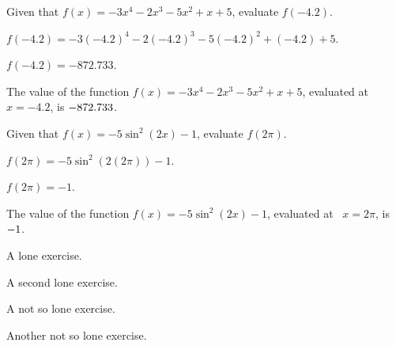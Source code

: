 \documentclass[handout]{ximera}
\begin{document}
\begin{shuffle}
\begin{exercise}
Given that $f(x)=-3 x^4-2 x^3-5 x^2+x+5$, evaluate $f(-4.2)$.
\begin{solution}
\begin{hint}
$f(-4.2)=-3 (-4.2)^4-2 (-4.2)^3-5 (-4.2)^2+(-4.2)+5$.
\end{hint}
\begin{hint}
$f(-4.2)=-872.733$.
\end{hint}
The value of the function $f(x) = -3 x^4-2 x^3-5 x^2+x+5$, evaluated at $x=-4.2$, is ${-872.733}$.
\end{solution}
\end{exercise}
\end{shuffle}



\begin{exercise}
Given that $f(x)=-5 \sin ^2(2 x)-1$, evaluate $f(2 \pi)$.
\begin{solution}
\begin{hint}
$f(2 \pi)=-5 \sin ^2(2 (2 \pi))-1$.
\end{hint}
\begin{hint}
$f(2 \pi)=-1$.
\end{hint}
The value of the function $f(x) = -5 \sin ^2(2 x)-1$, evaluated at \
$x=2 \pi$, is ${-1}$.
\end{solution}
\end{exercise}


\begin{exercise}
A lone exercise.
\end{exercise}

\begin{exercise}
A second lone exercise.
\end{exercise}


\begin{shuffle}
\begin{question}
A not so lone exercise.
\end{question}

\begin{question}
Another not so lone exercise.
\end{question}

\end{shuffle}
\end{document}
